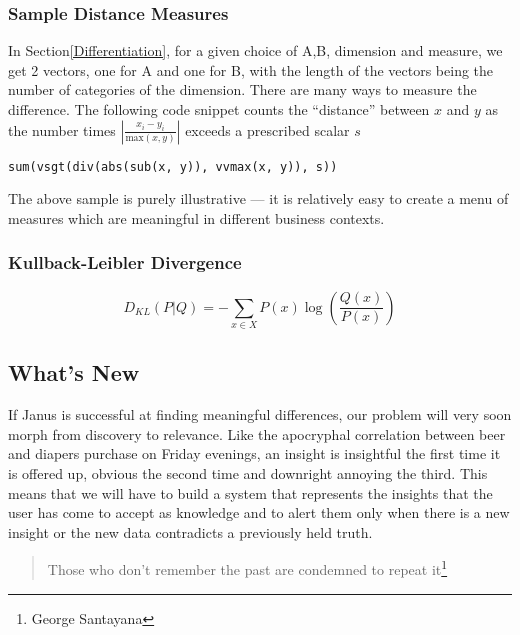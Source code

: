 \begin{itemize}

\subsubsection{Sample Distance Measures}

In Section\ref{Differentiation}, for a given choice of A,B, dimension and
measure, we get 2 vectors, one for A and one for B, with the length of the
vectors being the number of categories of the dimension. There are many ways to
measure the difference. The following code snippet counts the ``distance''
between \(x\) and \(y\) as the number times 
\(|\frac{x_i-y_i}{\mathrm{max}(x,y)}|\) exceeds a prescribed scalar \(s\)
\begin{verbatim}
sum(vsgt(div(abs(sub(x, y)), vvmax(x, y)), s))
\end{verbatim}
The above sample is purely illustrative --- it is relatively easy to create a
menu of measures which are meaningful in different business contexts.

\subsubsection{Kullback-Leibler Divergence}
\label{KLDistance}

\begin{displaymath}
D_{KL}(P | Q ) = - \sum_{x \in X} P(x) \log ( \frac{Q(x)}{P(x)})
\end{displaymath}

\subsection{What's New}
\label{WhatsNew}

If Janus is successful at finding meaningful differences, our problem will very
soon morph from discovery to relevance. Like the apocryphal correlation between
beer and diapers purchase on Friday evenings, an insight is insightful the first
time it is offered up, obvious the second time and downright annoying the third.
This means that we will have to build a system that represents the insights that
the user has come to accept as knowledge and to alert them only when there is a
new insight or the new data contradicts a previously held truth.

\begin{quote}
Those who don't remember the past are condemned to repeat it\footnote{George
Santayana}
\end{quote}


\end{itemize}
